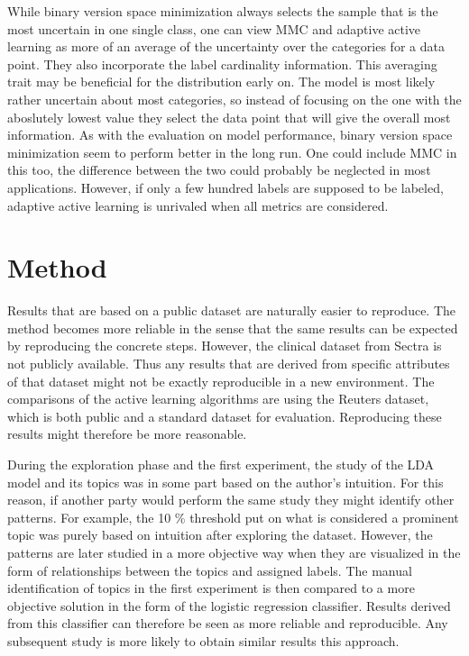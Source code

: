 While binary version space minimization always selects the sample that is the most uncertain in one single class, one can view MMC and adaptive active learning as more of an average of the uncertainty over the categories for a data point.
They also incorporate the label cardinality information.
This averaging trait may be beneficial for the distribution early on.
The model is most likely rather uncertain about most categories, so instead of focusing on the one with the aboslutely lowest value they select the data point that will give the overall most information.
As with the evaluation on model performance, binary version space minimization seem to perform better in the long run.
One could include MMC in this too, the difference between the two could probably be neglected in most applications.
However, if only a few hundred labels are supposed to be labeled, adaptive active learning is unrivaled when all metrics are considered.



\section{Method}
\label{sec:discussion-method}

Results that are based on a public dataset are naturally easier to reproduce.
The method becomes more reliable in the sense that the same results can be expected by reproducing the concrete steps.
However, the clinical dataset from Sectra is not publicly available.
Thus any results that are derived from specific attributes of that dataset might not be exactly reproducible in a new environment.
The comparisons of the active learning algorithms are using the Reuters dataset, which is both public and a standard dataset for evaluation.
Reproducing these results might therefore be more reasonable.

During the exploration phase and the first experiment, the study of the LDA model and its topics was in some part based on the author's intuition.
For this reason, if another party would perform the same study they might identify other patterns.
For example, the 10 \% threshold put on what is considered a prominent topic was purely based on intuition after exploring the dataset.
However, the patterns are later studied in a more objective way when they are visualized in the form of relationships between the topics and assigned labels.
The manual identification of topics in the first experiment is then compared to a more objective solution in the form of the logistic regression classifier.
Results derived from this classifier can therefore be seen as more reliable and reproducible.
Any subsequent study is more likely to obtain similar results this approach.

